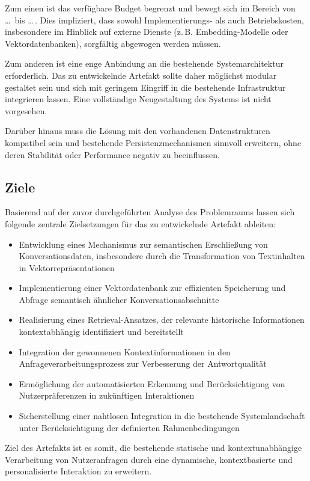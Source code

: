 Zum einen ist das verfügbare Budget begrenzt und bewegt sich im Bereich von \dots\ bis \dots\,. Dies impliziert, dass sowohl Implementierungs- als auch Betriebskosten, insbesondere im Hinblick auf externe Dienste (z.\,B. Embedding-Modelle oder Vektordatenbanken), sorgfältig abgewogen werden müssen.

Zum anderen ist eine enge Anbindung an die bestehende Systemarchitektur erforderlich. Das zu entwickelnde Artefakt sollte daher möglichst modular gestaltet sein und sich mit geringem Eingriff in die bestehende Infrastruktur integrieren lassen. Eine vollständige Neugestaltung des Systems ist nicht vorgesehen.

Darüber hinaus muss die Lösung mit den vorhandenen Datenstrukturen kompatibel sein und bestehende Persistenzmechanismen sinnvoll erweitern, ohne deren Stabilität oder Performance negativ zu beeinflussen.

\subsection{Ziele}

Basierend auf der zuvor durchgeführten Analyse des Problemraums lassen sich folgende zentrale Zielsetzungen für das zu entwickelnde Artefakt ableiten:

\begin{itemize}
	\item Entwicklung eines Mechanismus zur semantischen Erschließung von Konversationsdaten, insbesondere durch die Transformation von Textinhalten in Vektorrepräsentationen
	\item Implementierung einer Vektordatenbank zur effizienten Speicherung und Abfrage semantisch ähnlicher Konversationsabschnitte
	\item Realisierung eines Retrieval-Ansatzes, der relevante historische Informationen kontextabhängig identifiziert und bereitstellt
	\item Integration der gewonnenen Kontextinformationen in den Anfrageverarbeitungsprozess zur Verbesserung der Antwortqualität
	\item Ermöglichung der automatisierten Erkennung und Berücksichtigung von Nutzerpräferenzen in zukünftigen Interaktionen
	\item Sicherstellung einer nahtlosen Integration in die bestehende Systemlandschaft unter Berücksichtigung der definierten Rahmenbedingungen
\end{itemize}

Ziel des Artefakts ist es somit, die bestehende statische und kontextunabhängige Verarbeitung von Nutzeranfragen durch eine dynamische, kontextbasierte und personalisierte Interaktion zu erweitern.










